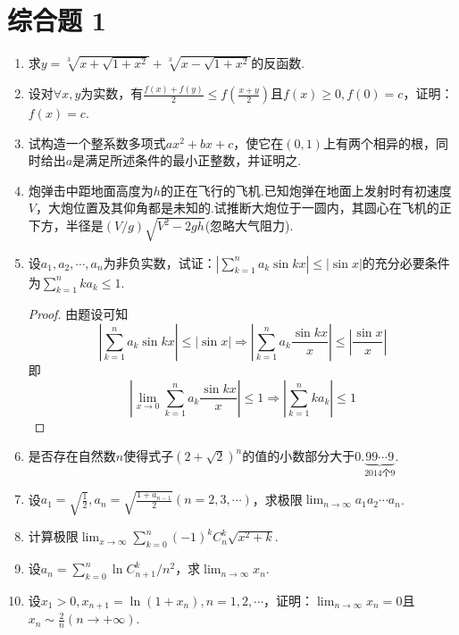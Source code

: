 \section{综合题 1}
\begin{enumerate}
	\item 求$y = \sqrt [ 3 ] { x + \sqrt { 1 + x ^ { 2 } } } + \sqrt [ 3 ] { x - \sqrt { 1 + x ^ { 2 } } }$的反函数.
	\item 设对$\forall x,y$为实数，有$\frac { f ( x ) + f ( y ) } { 2 } \leqslant f \left( \frac { x + y } { 2 } \right)$且$f ( x ) \geqslant 0 , f ( 0 ) = c$，证明：$f(x)=c$.
	\item 试构造一个整系数多项式$a x ^ { 2 } + b x + c$，使它在$(0,1)$上有两个相异的根，同时给出$a$是满足所述条件的最小正整数，并证明之.
	\item 炮弹击中距地面高度为$h$的正在飞行的飞机.已知炮弹在地面上发射时有初速度$V$，大炮位置及其仰角都是未知的.试推断大炮位于一圆内，其圆心在飞机的正下方，半径是$( V / g ) \sqrt { V ^ { 2 } - 2 g h }$(忽略大气阻力).
	\item 设$a _ { 1 } , a _ { 2 } , \cdots , a _ { n }$为非负实数，试证：$\left| \sum _ { k = 1 } ^ { n } a _ { k } \sin k x \right| \leqslant | \sin x |$的充分必要条件为$\sum _ { k = 1 } ^ { n } k a _ { k } \leqslant 1$.
\begin{proof}
	由题设可知
	\[
	\left|\sum_{k=1}^n{a_k}\sin kx\right|\le\left|\sin x\right|\Rightarrow\left|\sum_{k=1}^n{a_k}\frac{\sin kx}{x}\right|\le\left|\frac{\sin x}{x}\right|
	\]
	即
	\[
	\left|\lim_{x\rightarrow 0}\sum_{k=1}^n{a_k}\frac{\sin kx}{x}\right|\le 1\Rightarrow\left|\sum_{k=1}^n{ka_k}\right|\le 1
	\]
\end{proof}
	\item 是否存在自然数$n$使得式子$( 2 + \sqrt { 2 } ) ^ { n }$的值的小数部分大于$0 . \underbrace { 99 \cdots 9 } _ { 2014 \text{个} 9 }$.
	\item 设$a _ { 1 } = \sqrt { \frac { 1 } { 2 } } , a _ { n } = \sqrt { \frac { 1 + a _ { n - 1 } } { 2 } } ( n = 2,3 , \cdots )$，求极限$\lim _ { n \rightarrow \infty } a _ { 1 } a _ { 2 } \cdots a _ { n }$.
	\item 计算极限$\lim _ { x \rightarrow \infty } \sum _ { k = 0 } ^ { n } ( - 1 ) ^ { k } C _ { n } ^ { k } \sqrt { x ^ { 2 } + k }$.
	\item 设$a _ { n } = \sum _ { k = 0 } ^ { n } \ln C _ { n + 1 } ^ { k } / n ^ { 2 }$，求$\lim_{ n \rightarrow \infty }x_{n}$.
	\item 设$x _ { 1 } > 0 , x _ { n + 1 } = \ln \left( 1 + x _ { n } \right) , n = 1,2 , \cdots$，证明：$\lim _ { n \rightarrow \infty } x _ { n } = 0$且$x _ { n } \sim \frac { 2 } { n } ( n \rightarrow + \infty )$.

\end{enumerate}
